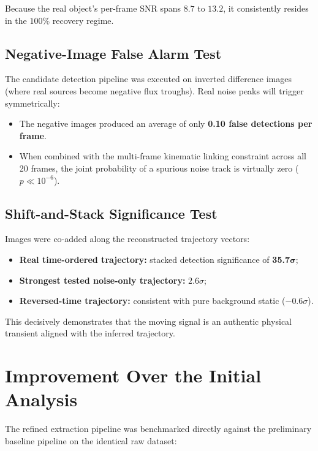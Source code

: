 \documentclass[11pt,a4paper]{article}
\begin{document}
Because the real object's per-frame SNR spans $8.7$ to $13.2$, it consistently resides in the $100\%$ recovery regime.

\subsection{Negative-Image False Alarm Test}

The candidate detection pipeline was executed on inverted difference images (where real sources become negative flux troughs). Real noise peaks will trigger symmetrically:
\begin{itemize}[noitemsep]
    \item The negative images produced an average of only \textbf{0.10 false detections per frame}.
    \item When combined with the multi-frame kinematic linking constraint across all 20 frames, the joint probability of a spurious noise track is virtually zero ($p \ll 10^{-6}$).
\end{itemize}

\subsection{Shift-and-Stack Significance Test}

Images were co-added along the reconstructed trajectory vectors:
\begin{itemize}[noitemsep]
    \item \textbf{Real time-ordered trajectory:} stacked detection significance of \textbf{35.7}$\boldsymbol{\sigma}$;
    \item \textbf{Strongest tested noise-only trajectory:} $2.6\sigma$;
    \item \textbf{Reversed-time trajectory:} consistent with pure background static ($-0.6\sigma$).
\end{itemize}

This decisively demonstrates that the moving signal is an authentic physical transient aligned with the inferred trajectory.

\section{Improvement Over the Initial Analysis}

The refined extraction pipeline was benchmarked directly against the preliminary baseline pipeline on the identical raw dataset:
\end{document}

